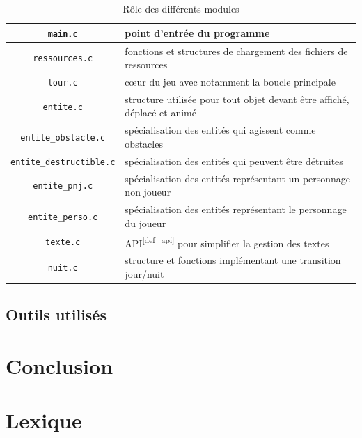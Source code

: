 \documentclass[a4paper,12pt]{article}
\newcommand\refsuscrite[1]{\textsuperscript{\ref{#1}}}
\begin{document}
\begin{table}[H]
    \centering
    \begin{tabular}{c p{}}
	\toprule
	\texttt{main.c}			    & point d’entrée du programme	\\
	\midrule
	\texttt{ressources.c}		    & fonctions et structures de chargement des fichiers de ressources	\\
	\midrule
	\texttt{tour.c}			    & cœur du jeu avec notamment la boucle principale	\\
	\midrule
	\texttt{entite.c}                   & structure utilisée pour tout objet devant être affiché, déplacé et animé  \\
	\midrule
	\texttt{entite\_obstacle.c}          & spécialisation des entités qui agissent comme obstacles  \\
	\midrule
	\texttt{entite\_destructible.c}	    & spécialisation des entités qui peuvent être détruites \\
	\midrule
	\texttt{entite\_pnj.c}		    & spécialisation des entités représentant un personnage non joueur	\\
	\midrule
	\texttt{entite\_perso.c}		    & spécialisation des entités représentant le personnage du joueur	\\
	\midrule
	\texttt{texte.c}		    & API\refsuscrite{def_api} pour simplifier la gestion des textes   \\
	\midrule
	\texttt{nuit.c}			    & structure et fonctions implémentant une transition jour/nuit \\
	\bottomrule
    \end{tabular}
    \caption{Rôle des différents modules}
\end{table}

\subsection{Outils utilisés}



\section{Conclusion}



\newpage
\appendix

\section{Lexique}
\end{document}
